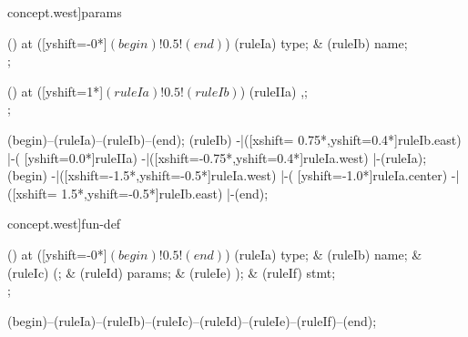 \begin{syntax}[[xshift=20mm]concept.west]{params}
  
  \node[sequence,column sep=1.5cm] () at ([yshift=-0*\syntaxruledist]$(begin)!0.5!(end)$) {
    \node[nonterminal] (ruleIa) {type};
    &
    \node[terminal]    (ruleIb) {name};
    \\
  };
  
  \node[sequence,column sep=1.0cm] () at ([yshift=1*\syntaxruledist]$(ruleIa)!0.5!(ruleIb)$) {
    \node[terminal]    (ruleIIa) {,};
    \\
  };
  
  \draw[path] (begin)--(ruleIa)--(ruleIb)--(end);
  \draw[path] (ruleIb)
            -|([xshift= 0.75*\syntaxruledist,yshift=0.4*\syntaxruledist]ruleIb.east)
            |-(                            [yshift=0.0*\syntaxruledist]ruleIIa)
            -|([xshift=-0.75*\syntaxruledist,yshift=0.4*\syntaxruledist]ruleIa.west)
            |-(ruleIa);
  \draw[path] (begin)
            -|([xshift=-1.5*\syntaxruledist,yshift=-0.5*\syntaxruledist]ruleIa.west)
            |-(                            [yshift=-1.0*\syntaxruledist]ruleIa.center)
            -|([xshift= 1.5*\syntaxruledist,yshift=-0.5*\syntaxruledist]ruleIb.east)
            |-(end);
\end{syntax}

\begin{syntax}[[xshift=20mm]concept.west]{fun-def}
  
  \node[sequence,column sep=1.2cm] () at ([yshift=-0*\syntaxruledist]$(begin)!0.5!(end)$) {
    \node[nonterminal] (ruleIa) {type};
    &
    \node[terminal]    (ruleIb) {name};
    &
    \node[terminal]    (ruleIc) {(};
    &
    \node[nonterminal] (ruleId) {params};
    &
    \node[terminal]    (ruleIe) {)};
    &
    \node[terminal]    (ruleIf) {stmt};
    \\
  };
  
  \draw[path] (begin)--(ruleIa)--(ruleIb)--(ruleIc)--(ruleId)--(ruleIe)--(ruleIf)--(end);
\end{syntax}

